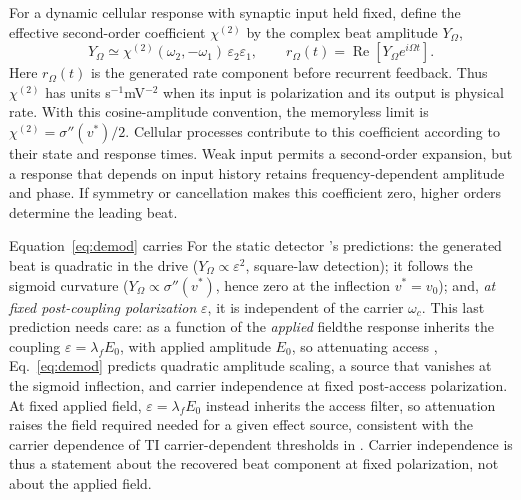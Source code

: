 \documentclass[11pt,a4paper]{article}
\newcommand{\Sig}{\sigma}
\providecommand{\DIFaddtex}[1]{{\protect\color{blue} \sf #1}} %
\providecommand{\DIFdeltex}[1]{{\protect\color{red} \scriptsize #1}} %
\providecommand{\DIFaddbegin}{} %
\providecommand{\DIFaddend}{} %
\providecommand{\DIFdelbegin}{} %
\providecommand{\DIFdelend}{} %
\providecommand{\DIFadd}[1]{\texorpdfstring{\DIFaddtex{#1}}{#1}} %
\providecommand{\DIFdel}[1]{\texorpdfstring{\DIFdeltex{#1}}{}} %
\begin{document}
For a dynamic cellular response with synaptic input held fixed, define the
effective second-order coefficient $\chi^{(2)}$ by the complex beat amplitude
$Y_\Omega$,
\begin{equation}
Y_\Omega\simeq\chi^{(2)}(\omega_2,-\omega_1)\,
\varepsilon_2\varepsilon_1,\qquad
r_\Omega(t)=\operatorname{Re}\!\left[Y_\Omega e^{i\Omega t}\right].
\label{eq:chi2}
\end{equation}
Here $r_\Omega(t)$ is the generated rate component before recurrent feedback.
Thus $\chi^{(2)}$ has units s$^{-1}$mV$^{-2}$ when its input is polarization
and its output is physical rate. With this cosine-amplitude convention, the memoryless limit is
$\chi^{(2)}=\Sig''(v^*)/2$. Cellular processes contribute to this coefficient according to their state and
response times. Weak input permits a second-order expansion, but a response
that depends on input history retains frequency-dependent amplitude and phase.
If symmetry or cancellation makes this coefficient zero, higher orders determine
the leading beat.

\DIFdelbegin \DIFdel{Equation~\eqref{eq:demod} carries }\DIFdelend \DIFaddbegin \DIFadd{For }\DIFaddend the static detector\DIFdelbegin \DIFdel{'s predictions: the
generated beat is quadratic in the drive ($Y_\Omega\propto\varepsilon^2$, square-law detection); it follows the sigmoid curvature
($Y_\Omega\propto\Sig''(v^*)$, hence zero at the inflection $v^*=v_0$); and, \emph{at
fixed post-coupling polarization} $\varepsilon$, it is independent of the carrier
$\omega_c$. This last prediction needs care: as a function of the \emph{applied} fieldthe
response inherits the coupling $\varepsilon=\lambda_f E_0$, with applied amplitude $E_0$,
so attenuating access }\DIFdelend \DIFaddbegin \DIFadd{, Eq.~\eqref{eq:demod} predicts quadratic amplitude
scaling, a source that vanishes at the sigmoid inflection, and carrier
independence at fixed post-access polarization. At fixed applied field,
$\varepsilon=\lambda_f E_0$ instead inherits the access filter, so attenuation
}\DIFaddend raises the field \DIFdelbegin \DIFdel{required }\DIFdelend \DIFaddbegin \DIFadd{needed }\DIFaddend for a given \DIFdelbegin \DIFdel{effect}\DIFdelend \DIFaddbegin \DIFadd{source}\DIFaddend , consistent with the \DIFdelbegin \DIFdel{carrier
dependence of TI }\DIFdelend \DIFaddbegin \DIFadd{carrier-dependent
}\DIFaddend thresholds in \cite{opancar2025,peripheral2023}.
\DIFdelbegin \DIFdel{Carrier independence is thus a statement about the recovered beat component at fixed
polarization, not about the applied field.
}\DIFdelend
\end{document}

